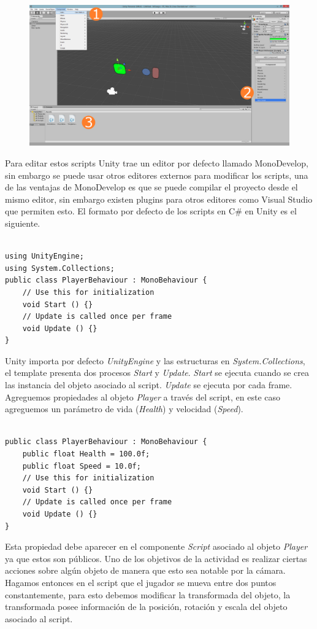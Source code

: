 \begin{figure}[H]
\centering
\includegraphics[width=0.80\linewidth]{media/1_ss7.jpg} 
\label{fig:unity_7}
\end{figure}

Para editar estos scripts Unity trae un editor por defecto llamado MonoDevelop, sin embargo se puede usar otros editores externos para modificar los scripts, una de las ventajas de MonoDevelop es que se puede compilar el proyecto desde el mismo editor, sin embargo existen plugins para otros editores como Visual Studio que permiten esto. El formato por defecto de los scripts en C\# en Unity es el siguiente.\\~

\lstset{language=[Sharp]C}
\begin{lstlisting}
using UnityEngine;
using System.Collections;
public class PlayerBehaviour : MonoBehaviour {
	// Use this for initialization
	void Start () {}	
	// Update is called once per frame
	void Update () {}
}
\end{lstlisting}

Unity importa por defecto \emph{UnityEngine} y las estructuras en \emph{System.Collections}, el template presenta dos procesos \emph{Start} y \emph{Update}. \emph{Start} se ejecuta cuando se crea las instancia del objeto asociado al script. \emph{Update} se ejecuta por cada frame. Agreguemos propiedades al objeto \emph{Player} a través del script, en este caso agreguemos un parámetro de vida (\emph{Health}) y velocidad (\emph{Speed}).\\~

\begin{lstlisting}
public class PlayerBehaviour : MonoBehaviour {
	public float Health = 100.0f;
	public float Speed = 10.0f;
	// Use this for initialization
	void Start () {}	
	// Update is called once per frame
	void Update () {}
}
\end{lstlisting}

Esta propiedad debe aparecer en el componente \emph{Script} asociado al objeto \emph{Player} ya que estos son públicos. Uno de los objetivos de la actividad es realizar ciertas acciones sobre algún objeto de manera que esto sea notable por la cámara. Hagamos entonces en el script que el jugador se mueva entre dos puntos constantemente, para esto debemos modificar la transformada del objeto, la transformada posee información de la posición, rotación y escala del objeto asociado al script.\\~

